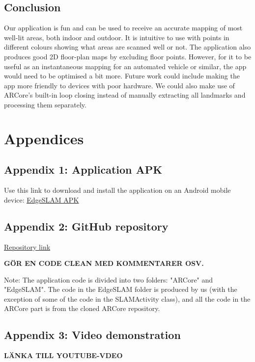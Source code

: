 \documentclass{article}
\begin{document}
\subsection{Conclusion}
Our application is fun and can be used to receive an accurate mapping of most well-lit areas, both indoor and outdoor. It is intuitive to use with points in different colours showing what areas are scanned well or not. The application also produces good 2D floor-plan maps by excluding floor points. However, for it to be useful as an instantaneous mapping for an automated vehicle or similar, the app would need to be optimised a bit more. Future work could include making the app more friendly to devices with poor hardware. We could also make use of ARCore's built-in loop closing instead of manually extracting all landmarks and processing them separately.

  


\section*{Appendices}

\subsection*{Appendix 1: Application APK}

Use this link to download and install the application on an Android mobile device: \underline{\href{https://gofile.io/d/qrnUMs}{EdgeSLAM APK}}

\subsection*{Appendix 2: GitHub repository}

\underline{\href{https://github.com/jonatan-flyckt/edge-project}{Repository link}}

\textbf{GÖR EN CODE CLEAN MED KOMMENTARER OSV.}

Note: The application code is divided into two folders: "ARCore" and "EdgeSLAM". The code in the EdgeSLAM folder is produced by us (with the exception of some of the code in the SLAMActivity class), and all the code in the ARCore part is from the cloned ARCore repository.

\subsection*{Appendix 3: Video demonstration}
\textbf{LÄNKA TILL YOUTUBE-VDEO}
\end{document}
